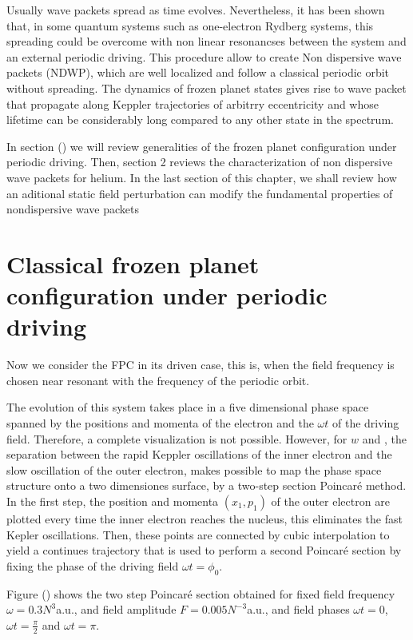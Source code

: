 

Usually wave packets spread as time evolves. Nevertheless, it has been shown that, in some quantum systems such as one-electron Rydberg systems, this spreading could be overcome with non linear resonancses between the system and an external periodic driving. This procedure allow to create Non dispersive wave packets (NDWP), which are well localized and follow a classical periodic orbit without spreading. The dynamics of frozen planet states gives rise to wave packet that propagate along Keppler trajectories of arbitrry eccentricity and whose lifetime can be considerably long compared to any other state in the spectrum.

In section () we will review generalities of the frozen planet configuration under periodic driving. Then, section 2 reviews the characterization of non dispersive wave packets for helium. In the last section of this chapter, we shall review how an aditional static field perturbation can modify the fundamental properties of nondispersive wave packets

\section{Classical frozen planet configuration under periodic driving}

Now we consider the FPC in its driven case, this is, when the field frequency is chosen near resonant with the frequency of the periodic orbit.

The evolution of this system takes place in a five dimensional phase space spanned by  the positions and momenta of the electron and the $ \omega t $ of the driving field. Therefore, a complete visualization is not possible. However, for $ w $ and $  $, the separation between the rapid Keppler oscillations of the inner electron and the slow oscillation of the outer electron, makes possible to map the phase space structure onto a two dimensiones surface, by a two-step section Poincaré method. In the first step, the position and momenta $ (x_{1},p_{1}) $ of the outer electron are plotted every time the inner electron reaches the nucleus, this eliminates the fast Kepler oscillations. Then, these points are connected by cubic interpolation to yield a continues trajectory that is used to perform a second Poincaré section by fixing the phase of the driving field $ \omega t=\phi_{0} $.

Figure () shows the two step Poincaré section obtained for fixed field frequency $ \omega = 0.3N^{3} $a.u., and field amplitude $ F=0.005 N^{-3} $a.u., and field phases $ \omega t=0 $, $ \omega t=\frac{\pi}{2} $ and $ \omega t= \pi $.